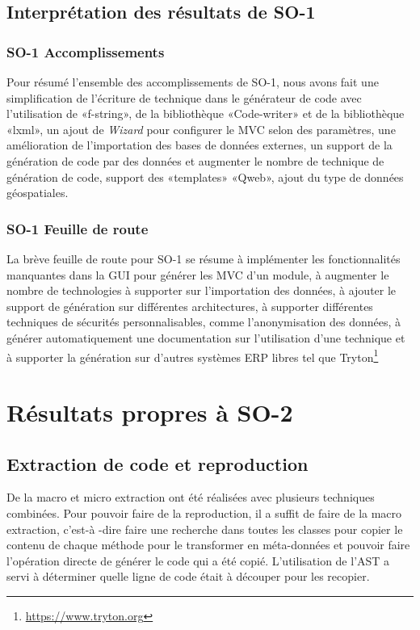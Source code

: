 
\subsection{Interprétation des résultats de SO-1}

\subsubsection{SO-1 Accomplissements}
Pour résumé l'ensemble des accomplissements de SO-1, nous avons fait une simplification de l’écriture de technique dans le générateur de code avec l’utilisation de «f-string», de la bibliothèque «Code-writer» et de la bibliothèque «lxml», un ajout de \textit{Wizard} pour configurer le MVC selon des paramètres, une amélioration de l’importation des bases de données externes, un support de la génération de code par des données et augmenter le nombre de technique de génération de code, support des «templates» «Qweb», ajout du type de données géospatiales.

\subsubsection{SO-1 Feuille de route}
La brève feuille de route pour SO-1 se résume à implémenter les fonctionnalités manquantes dans la GUI pour générer les MVC d’un module, à augmenter le nombre de technologies à supporter sur l'importation des données, à ajouter le support de génération sur différentes architectures, à supporter différentes techniques de sécurités personnalisables, comme l’anonymisation des données, à générer automatiquement une documentation sur l’utilisation d’une technique et à supporter la génération sur d’autres systèmes ERP libres tel que Tryton\footnote{\url{https://www.tryton.org}}

\section{Résultats propres à SO-2}

\subsection {Extraction de code et reproduction}

De la macro et micro extraction ont été réalisées avec plusieurs techniques combinées. Pour pouvoir faire de la reproduction, il a suffit de faire de la macro extraction, c'est-à -dire faire une recherche dans toutes les classes pour copier le contenu de chaque méthode pour le transformer en méta-données et pouvoir faire l’opération directe de générer le code qui a été copié. L’utilisation de l’AST a servi à déterminer quelle ligne de code était à découper pour les recopier.

